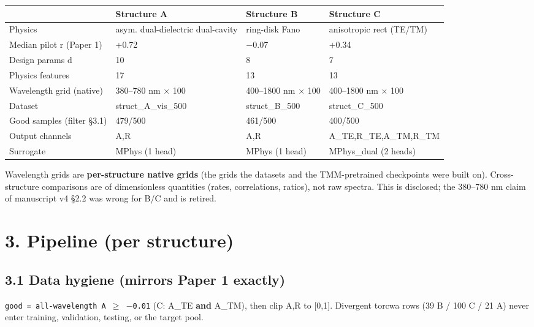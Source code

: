 \documentclass[11pt,a4paper]{article}
\newcounter{none}   %
\begin{document}
\begingroup
\setlength{\tabcolsep}{3pt}\footnotesize
{}
\label{stab:4}
{\def\LTcaptype{none} %
\begin{longtable}[]{@{}llll@{}}
\toprule\noalign{} & Structure A & Structure B & Structure C \\
\midrule\noalign{}
\endhead
\bottomrule\noalign{}
\endlastfoot
Physics & asym. dual-dielectric dual-cavity & ring-disk Fano & anisotropic rect (TE/TM) \\
Median pilot r (Paper 1) & +0.72 & \ensuremath{-}0.07 & +0.34 \\
Design params d & 10 & 8 & 7 \\
Physics features & 17 & 13 & 13 \\
Wavelength grid (native) & 380--780 nm \ensuremath{\times} 100 & 400--1800 nm \ensuremath{\times} 100 & 400--1800 nm \ensuremath{\times} 100 \\
Dataset & struct\_A\_vis\_500 & struct\_B\_500 & struct\_C\_500 \\
Good samples (filter \S{}3.1) & 479/500 & 461/500 & 400/500 \\
Output channels & A,R & A,R & A\_TE,R\_TE,A\_TM,R\_TM \\
Surrogate & MPhys (1 head) & MPhys (1 head) & MPhys\_dual (2 heads) \\
\end{longtable}
}
\endgroup

Wavelength grids are \textbf{per-structure native grids} (the grids the datasets
and the TMM-pretrained checkpoints were built on). Cross-structure comparisons
are of dimensionless quantities (rates, correlations, ratios), not raw spectra.
This is disclosed; the 380--780 nm claim of manuscript v4 \S{}2.2 was wrong for
B/C and is retired.

\section*{3. Pipeline (per structure)}

\subsection*{3.1 Data hygiene (mirrors Paper 1 exactly)}

\texttt{good\ =\ all-wavelength\ A\ \ensuremath{\geq}\ \ensuremath{-}0.01} (C: A\_TE \textbf{and} A\_TM), then clip A,R to
{[}0,1{]}. Divergent torcwa rows (39 B / 100 C / 21 A) never enter training,
validation, testing, or the target pool.
\end{document}
